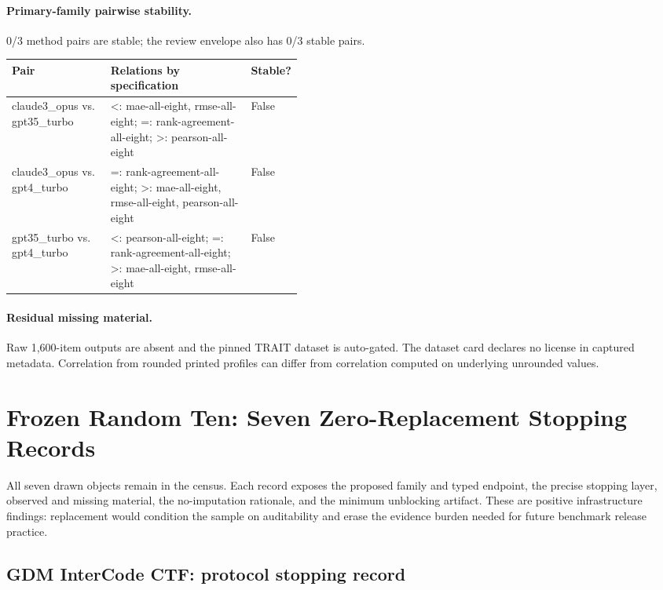 \paragraph{Primary-family pairwise stability.} 0/3 method pairs are stable; the review envelope also has 0/3 stable pairs.
\begin{center}\scriptsize
\begin{tabularx}{\linewidth}{@{}p{0.34\linewidth}Xp{0.09\linewidth}@{}}
\toprule Pair & Relations by specification & Stable? \\
\midrule
claude3\_opus vs. gpt35\_turbo & <: mae-all-eight, rmse-all-eight; =: rank-agreement-all-eight; >: pearson-all-eight & False \\
claude3\_opus vs. gpt4\_turbo & =: rank-agreement-all-eight; >: mae-all-eight, rmse-all-eight, pearson-all-eight & False \\
gpt35\_turbo vs. gpt4\_turbo & <: pearson-all-eight; =: rank-agreement-all-eight; >: mae-all-eight, rmse-all-eight & False \\
\bottomrule\end{tabularx}\end{center}

\paragraph{Residual missing material.} Raw 1,600-item outputs are absent and the pinned TRAIT dataset is auto-gated. The dataset card declares no license in captured metadata. Correlation from rounded printed profiles can differ from correlation computed on underlying unrounded values.


\section{Frozen Random Ten: Seven Zero-Replacement Stopping Records}\label{app:r8-random-stops}

All seven drawn objects remain in the census.  Each record exposes the proposed family and typed endpoint, the precise stopping layer, observed and missing material, the no-imputation rationale, and the minimum unblocking artifact.  These are positive infrastructure findings: replacement would condition the sample on auditability and erase the evidence burden needed for future benchmark release practice.

\subsection{GDM InterCode CTF: protocol stopping record}\label{app:r8-gdm-intercode-ctf}

